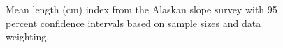 \documentclass[
]{scrartcl}
\begin{document}
\begin{figure}[H]


\caption{\label{fig-meanlt-akslope}Mean length (cm) index from the
Alaskan slope survey with 95 percent confidence intervals based on
sample sizes and data weighting.}

\end{figure}%
\end{document}
